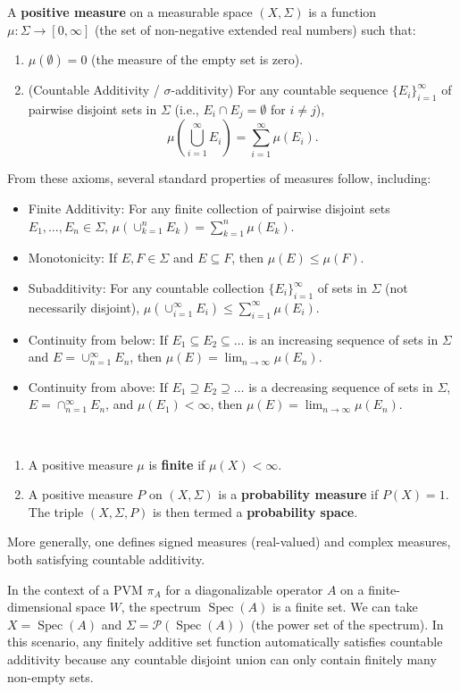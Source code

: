 \begin{definition}
A \textbf{positive measure} on a measurable space $(X, \Sigma)$ is a function $\mu: \Sigma \to [0, \infty]$ (the set of non-negative extended real numbers) such that:
\begin{enumerate}
    \item $\mu(\emptyset) = 0$ (the measure of the empty set is zero).
    \item (Countable Additivity / $\sigma$-additivity) For any countable sequence $\{E_i\}_{i=1}^\infty$ of pairwise disjoint sets in $\Sigma$ (i.e., $E_i \cap E_j = \emptyset$ for $i \neq j$),
        \[ \mu\left(\bigcup_{i=1}^\infty E_i\right) = \sum_{i=1}^\infty \mu(E_i). \]
\end{enumerate}
\end{definition}
From these axioms, several standard properties of measures follow, including:
\begin{itemize}
    \item Finite Additivity: For any finite collection of pairwise disjoint sets $E_1, \dots, E_n \in \Sigma$, $\mu(\cup_{k=1}^n E_k) = \sum_{k=1}^n \mu(E_k)$.
    \item Monotonicity: If $E, F \in \Sigma$ and $E \subseteq F$, then $\mu(E) \le \mu(F)$.
    \item Subadditivity: For any countable collection $\{E_i\}_{i=1}^\infty$ of sets in $\Sigma$ (not necessarily disjoint), $\mu(\cup_{i=1}^\infty E_i) \le \sum_{i=1}^\infty \mu(E_i)$.
    \item Continuity from below: If $E_1 \subseteq E_2 \subseteq \dots$ is an increasing sequence of sets in $\Sigma$ and $E = \cup_{n=1}^\infty E_n$, then $\mu(E) = \lim_{n\to\infty} \mu(E_n)$.
    \item Continuity from above: If $E_1 \supseteq E_2 \supseteq \dots$ is a decreasing sequence of sets in $\Sigma$, $E = \cap_{n=1}^\infty E_n$, and $\mu(E_1) < \infty$, then $\mu(E) = \lim_{n\to\infty} \mu(E_n)$.
\end{itemize}

\begin{definition}\,
\begin{enumerate}
    \item A positive measure $\mu$ is \textbf{finite} if $\mu(X) < \infty$.
    \item A positive measure $P$ on $(X, \Sigma)$ is a \textbf{probability measure} if $P(X) = 1$. The triple $(X, \Sigma, P)$ is then termed a \textbf{probability space}.
\end{enumerate}
More generally, one defines signed measures (real-valued) and complex measures, both satisfying countable additivity.
\end{definition}
In the context of a PVM $\pi_A$ for a diagonalizable operator $A$ on a finite-dimensional space $W$, the spectrum $\operatorname{Spec}(A)$ is a finite set. We can take $X = \operatorname{Spec}(A)$ and $\Sigma = \mathcal{P}(\operatorname{Spec}(A))$ (the power set of the spectrum). In this scenario, any finitely additive set function automatically satisfies countable additivity because any countable disjoint union can only contain finitely many non-empty sets.

